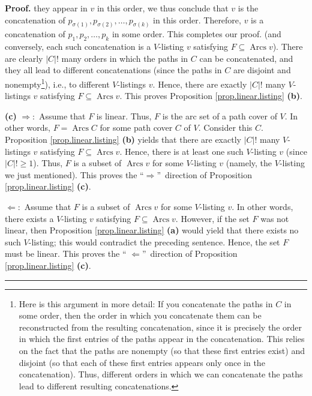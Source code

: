 \documentclass[numbers=enddot,12pt,final,onecolumn,notitlepage]{scrartcl}%
\numberwithin{exer}{section}
\theoremstyle{definition}
\newenvironment{proof}[1][Proof]{\noindent\textbf{#1.} }{\ \rule{0.5em}{0.5em}}
\newenvironment{verlong}{}{}
\begin{document}
\begin{verlong}
\begin{proof}
{they appear in $v$ in this order, we thus conclude that $v$ is the
concatenation of $p_{\sigma\left(  1\right)  },p_{\sigma\left(  2\right)
},\ldots,p_{\sigma\left(  k\right)  }$ in this order. Therefore, $v$ is a
concatenation of $p_{1},p_{2},\ldots,p_{k}$ in some order. This completes our
proof.} (and conversely, each such concatenation is a $V$-listing $v$
satisfying $F\subseteq\operatorname*{Arcs}v$). There are clearly $\left\vert
C\right\vert !$ many orders in which the paths in $C$ can be concatenated, and
they all lead to different concatenations (since the paths in $C$ are disjoint
and nonempty\footnote{Here is this argument in more detail: If you concatenate
the paths in $C$ in some order, then the order in which you concatenate them
can be reconstructed from the resulting concatenation, since it is precisely
the order in which the first entries of the paths appear in the concatenation.
This relies on the fact that the paths are nonempty (so that these first
entries exist) and disjoint (so that each of these first entries appears only
once in the concatenation). Thus, different orders in which we can concatenate
the paths lead to different resulting concatenations.}), i.e., to different
$V$-listings $v$. Hence, there are exactly $\left\vert C\right\vert !$ many
$V$-listings $v$ satisfying $F\subseteq\operatorname*{Arcs}v$. This proves
Proposition \ref{prop.linear.listing} \textbf{(b)}. \medskip

\textbf{(c)} $\Longrightarrow:$ Assume that $F$ is linear. Thus, $F$ is the
arc set of a path cover of $V$. In other words, $F=\operatorname*{Arcs}C$ for
some path cover $C$ of $V$. Consider this $C$. Proposition
\ref{prop.linear.listing} \textbf{(b)} yields that there are exactly
$\left\vert C\right\vert !$ many $V$-listings $v$ satisfying $F\subseteq
\operatorname*{Arcs}v$. Hence, there is at least one such $V$-listing $v$
(since $\left\vert C\right\vert !\geq1$). Thus, $F$ is a subset of
$\operatorname*{Arcs}v$ for some $V$-listing $v$ (namely, the $V$-listing we
just mentioned). This proves the \textquotedblleft$\Longrightarrow
$\textquotedblright\ direction of Proposition \ref{prop.linear.listing}
\textbf{(c)}.

$\Longleftarrow:$ Assume that $F$ is a subset of $\operatorname*{Arcs}v$ for
some $V$-listing $v$. In other words, there exists a $V$-listing $v$
satisfying $F\subseteq\operatorname*{Arcs}v$. However, if the set $F$ was not
linear, then Proposition \ref{prop.linear.listing} \textbf{(a)} would yield
that there exists no such $V$-listing; this would contradict the preceding
sentence. Hence, the set $F$ must be linear. This proves the \textquotedblleft%
$\Longleftarrow$\textquotedblright\ direction of Proposition
\ref{prop.linear.listing} \textbf{(c)}.
\end{proof}
\end{verlong}
\end{document}
